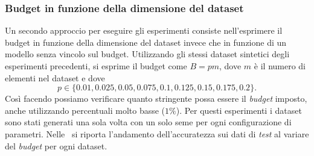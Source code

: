 \subsubsection{Budget in funzione della dimensione del dataset}
Un secondo approccio per eseguire gli esperimenti consiste nell'esprimere il budget in funzione della dimensione del dataset invece che in funzione di un modello senza vincolo sul budget.
Utilizzando gli stessi dataset sintetici degli esperimenti precedenti, si esprime il budget come $B=pm$, dove $m$ è il numero di elementi nel dataset e dove
\begin{equation*}
    p\in\{0.01, 0.025, 0.05, 0.075, 0.1, 0.125, 0.15, 0.175, 0.2\}.
\end{equation*}
Così facendo possiamo verificare quanto stringente possa essere il \emph{budget} imposto, anche utilizzando percentuali molto basse ($1\%$).
Per questi esperimenti i dataset sono stati generati una sola volta con un solo seme per ogni configurazione di parametri.
Nelle~ si riporta l'andamento dell'accuratezza sui dati di \emph{test} al variare del \emph{budget} per ogni dataset.

